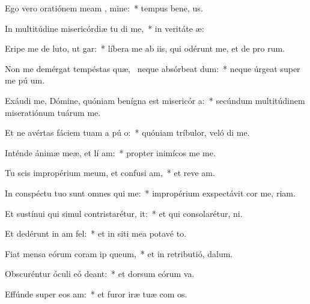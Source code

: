 \item Ego vero oratiónem meam  , mine:~* tempus bene, us.
\item In multitúdine misericórdiæ tu di me,~* in veritáte  æ:
\item Eripe me de luto, ut  gar:~* líbera me ab iis, qui odérunt me, et de pro rum.
\item Non me demérgat tempéstas quæ,~\pscross{} neque absórbeat  dum:~* neque úrgeat super me pú  um.
\item Exáudi me, Dómine, quóniam benígna est misericór a:~* secúndum multitúdinem miseratiónum tuárum   me.
\item Et ne avértas fáciem tuam a pú o:~* quóniam tríbulor, veló di me.
\item Inténde ánimæ meæ, et lí am:~* propter inimícos me  me.
\item Tu scis impropérium meum, et confusi am,~* et reve am.
\item In conspéctu tuo sunt omnes qui  me:~* impropérium exspectávit cor me,  riam.
\item Et sustínui qui simul contristarétur,   it:~* et qui consolarétur,   ni.
\item Et dedérunt in  am fel:~* et in siti mea potavé  to.
\item Fiat mensa eórum coram ip  queum,~* et in retributió,   dalum.
\item Obscuréntur óculi eó  deant:~* et dorsum eórum  va.
\item Effúnde super eos  am:~* et furor iræ tuæ com os.

